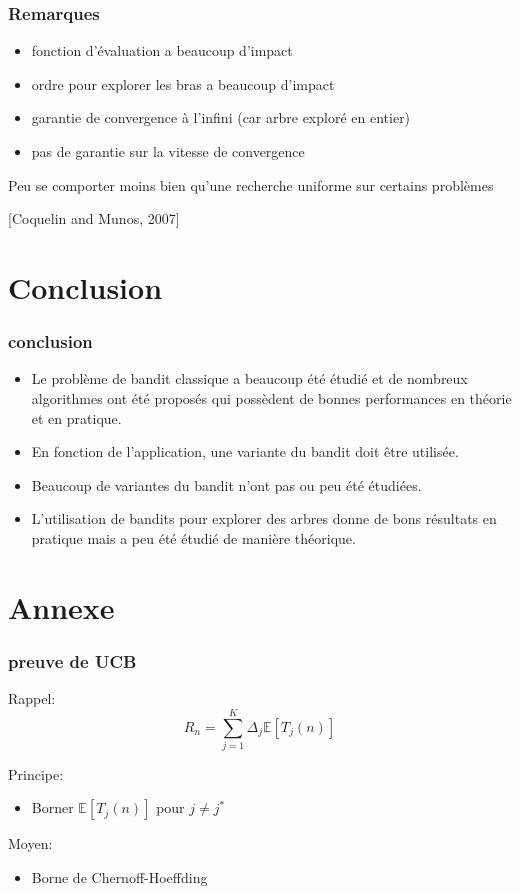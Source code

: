 \documentclass{beamer}
\begin{document}
\begin{frame}
    \frametitle{Remarques}
    \begin{itemize}
        \item fonction d'évaluation a beaucoup d'impact
        \item ordre pour explorer les bras a  beaucoup d'impact
        \item garantie de convergence à l'infini (car arbre exploré en entier)
        \item pas de garantie sur la vitesse de convergence

    \end{itemize}
    Peu se comporter moins bien qu'une recherche uniforme sur certains problèmes

    \hfill [Coquelin and Munos, 2007]

\end{frame}




\section*{Conclusion}

\begin{frame}
    \frametitle{conclusion}
    \begin{itemize}
        \item Le problème de bandit classique a beaucoup été étudié et de nombreux algorithmes ont été proposés qui possèdent de bonnes performances en théorie et en pratique.
        \item En fonction de l'application, une variante du bandit doit être utilisée. 
        \item Beaucoup de variantes du bandit n'ont pas ou peu été étudiées.
        \item L'utilisation de bandits pour explorer des arbres donne de bons résultats en pratique mais a peu été étudié de manière théorique.
    \end{itemize}
\end{frame}

\section*{Annexe}

\begin{frame}
    \frametitle{preuve de UCB}
    Rappel:
    $$R_n=\sum_{j=1}^{K} \Delta_j \mathbb{E} [T_j(n)]$$

    Principe:
    \begin{itemize}
        \item Borner $\mathbb{E} [T_j(n)]$ pour $j \ne j^*$
    \end{itemize}

    Moyen:
    \begin{itemize}
        \item Borne de Chernoff-Hoeffding
    \end{itemize}


\end{frame}
\end{document}

